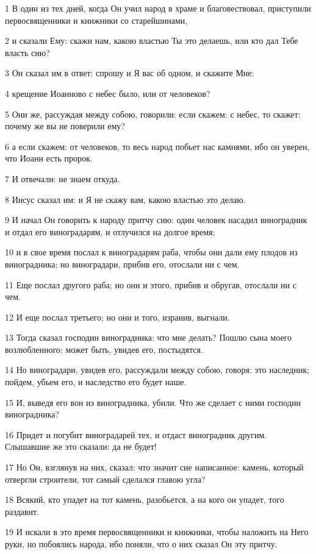 \par 1 В один из тех дней, когда Он учил народ в храме и благовествовал, приступили первосвященники и книжники со старейшинами,
\par 2 и сказали Ему: скажи нам, какою властью Ты это делаешь, или кто дал Тебе власть сию?
\par 3 Он сказал им в ответ: спрошу и Я вас об одном, и скажите Мне:
\par 4 крещение Иоанново с небес было, или от человеков?
\par 5 Они же, рассуждая между собою, говорили: если скажем: с небес, то скажет: почему же вы не поверили ему?
\par 6 а если скажем: от человеков, то весь народ побьет нас камнями, ибо он уверен, что Иоанн есть пророк.
\par 7 И отвечали: не знаем откуда.
\par 8 Иисус сказал им: и Я не скажу вам, какою властью это делаю.
\par 9 И начал Он говорить к народу притчу сию: один человек насадил виноградник и отдал его виноградарям, и отлучился на долгое время;
\par 10 и в свое время послал к виноградарям раба, чтобы они дали ему плодов из виноградника; но виноградари, прибив его, отослали ни с чем.
\par 11 Еще послал другого раба; но они и этого, прибив и обругав, отослали ни с чем.
\par 12 И еще послал третьего; но они и того, изранив, выгнали.
\par 13 Тогда сказал господин виноградника: что мне делать? Пошлю сына моего возлюбленного; может быть, увидев его, постыдятся.
\par 14 Но виноградари, увидев его, рассуждали между собою, говоря: это наследник; пойдем, убьем его, и наследство его будет наше.
\par 15 И, выведя его вон из виноградника, убили. Что же сделает с ними господин виноградника?
\par 16 Придет и погубит виноградарей тех, и отдаст виноградник другим. Слышавшие же это сказали: да не будет!
\par 17 Но Он, взглянув на них, сказал: что значит сие написанное: камень, который отвергли строители, тот самый сделался главою угла?
\par 18 Всякий, кто упадет на тот камень, разобьется, а на кого он упадет, того раздавит.
\par 19 И искали в это время первосвященники и книжники, чтобы наложить на Него руки, но побоялись народа, ибо поняли, что о них сказал Он эту притчу.
